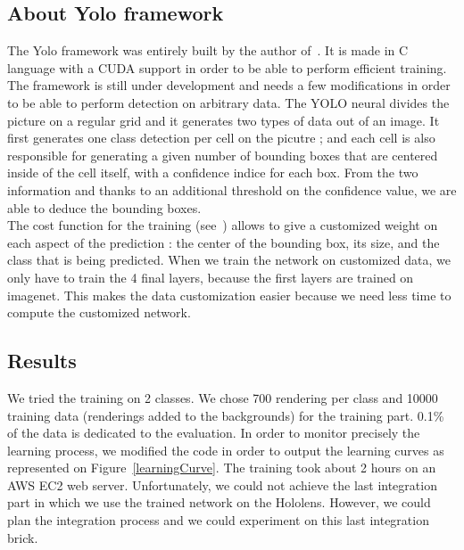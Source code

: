 \documentclass[10pt,twocolumn,letterpaper]{article}
\begin{document}
\subsection{About Yolo framework}
\label{subsec:YOLO_subsection}
The Yolo framework was entirely built by the author of~\cite{redmon_you_2015}. It is made in C language with 
a CUDA support in order to be able to perform efficient training. The framework is still under development 
and needs a few modifications in order to be able to perform detection on arbitrary data. The YOLO neural 
divides the picture on a regular grid and it generates two types of data out of an image. It first generates 
one class detection per cell on the picutre ; and each cell is also responsible for generating a given number 
of bounding boxes that are centered inside of the cell itself, with a confidence indice for each box. From 
the two information and thanks to an additional threshold on the confidence value, we are able to deduce the 
bounding boxes. \\
The cost function for the training (see~\cite{redmon_you_2015}) allows to give a customized weight on each 
aspect of the prediction : the center of the bounding box, its size, and the class that is being predicted. 
When we train the network on customized data, we only have to train the 4 final layers, because the first 
layers are trained on imagenet. This makes the data customization easier because we need less time to 
compute the customized network.

\subsection{Results}

We tried the training on 2 classes. We chose 700 rendering per class and 10000 training data (renderings 
added to the backgrounds) for the training part. 0.1\% of the data is dedicated to the evaluation. In 
order to monitor precisely the learning process, we modified the code in order to output the learning curves 
as represented on Figure~\ref{learningCurve}. The training took about 2 hours on an AWS EC2 web server. 
Unfortunately, we could not achieve the last integration part in which we use the trained network on the 
Hololens. However, we could plan the integration process and we could experiment on this last integration 
brick.
\end{document}
